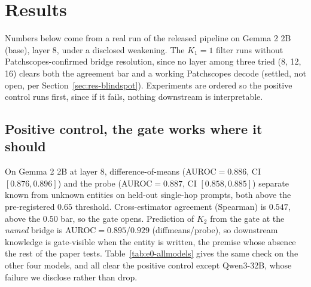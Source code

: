 \documentclass{article}
\begin{document}
\section{Results}
\label{sec:results}

Numbers below come from a real run of the released pipeline on Gemma 2 2B (base), layer 8, under a
disclosed weakening. The $K_1{=}1$ filter runs without Patchscopes-confirmed bridge resolution, since
no layer among three tried (8, 12, 16) clears both the agreement bar and a working Patchscopes decode
(settled, not open, per Section~\ref{sec:res-blindspot}). Experiments are ordered so the positive
control runs first, since if it fails, nothing downstream is interpretable.

\subsection{Positive control, the gate works where it should}
\label{sec:res-e0}

On Gemma 2 2B at layer 8, difference-of-means (AUROC$=0.886$, CI $[0.876,0.896]$) and the probe
(AUROC$=0.887$, CI $[0.858,0.885]$) separate known from unknown entities on held-out single-hop
prompts, both above the pre-registered $0.65$ threshold. Cross-estimator agreement (Spearman) is
$0.547$, above the $0.50$ bar, so the gate opens. Prediction of $K_2$ from the gate at the
\emph{named} bridge is AUROC$=0.895$/$0.929$ (diffmeans/probe), so downstream knowledge is
gate-visible when the entity is written, the premise whose absence the rest of the paper tests.
Table~\ref{tab:e0-allmodels} gives the same check on the other four models, and all clear the
positive control except Qwen3-32B, whose failure we disclose rather than drop.
\end{document}
